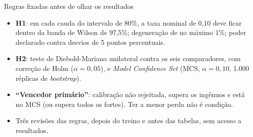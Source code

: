 \documentclass[aspectratio=169,10pt]{beamer}
\begin{document}
\begin{frame}{Regras fixadas antes de olhar os resultados}
  \centering

  \vspace{6pt}
  \raggedright\small
  \begin{itemize}
    \item \textbf{H1}: em cada cauda do intervalo de 80\%, a taxa nominal de 0,10 deve
      ficar dentro da banda de Wilson de 97,5\%; degeneração de no máximo 1\%;
      poder declarado contra desvios de 5 pontos percentuais.
    \item \textbf{H2}: teste de Diebold-Mariano unilateral contra os seis comparadores,
      com correção de Holm (\(\alpha = 0{,}05\)), e \textit{Model Confidence Set}
      (MCS, \(\alpha = 0{,}10\), 1.000 réplicas de \textit{bootstrap}).
    \item \textbf{``Vencedor primário''}: calibração não rejeitada, supera os ingênuos e está no MCS
      (ou supera todos os fortes). Ter a menor perda não é condição.
    \item Três revisões das regras, depois do treino e antes das tabelas, sem acesso a resultados.
  \end{itemize}
\end{frame}
\end{document}
